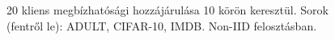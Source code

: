 \begin{figure}[H]
    \caption{20 kliens megbízhatósági hozzájárulása 10 körön keresztül. 
    Sorok (fentről le): ADULT, CIFAR-10, IMDB. 
    Non-IID felosztásban.}
    \label{fig:all_datasets_box_20_Non-IID}
\end{figure}



